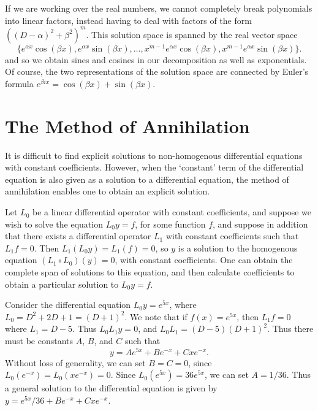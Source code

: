 \begin{remark}
    If we are working over the real numbers, we cannot completely break polynomials into linear factors, instead having to deal with factors of the form $((D - \alpha)^2 + \beta^2)^m$. This solution space is spanned by the real vector space
    \[ \{ e^{\alpha x} \cos(\beta x), e^{\alpha x} \sin(\beta x), \dots, x^{m-1} e^{\alpha x} \cos(\beta x), x^{m-1} e^{\alpha x} \sin(\beta x) \}. \]
    and so we obtain sines and cosines in our decomposition as well as exponentials. Of course, the two representations of the solution space are connected by Euler's formula $e^{\beta ix} = \cos(\beta x) + \sin(\beta x)$.
\end{remark}


\section{The Method of Annihilation}

It is difficult to find explicit solutions to non-homogenous differential equations with constant coefficients. However, when the `constant' term of the differential equation is also given as a solution to a differential equation, the method of annihilation enables one to obtain an explicit solution.

Let $L_0$ be a linear differential operator with constant coefficients, and suppose we wish to solve the equation $L_0y = f$, for some function $f$, and suppose in addition that there exists a differential operator $L_1$ with constant coefficients such that $L_1f = 0$. Then $L_1(L_0 y) = L_1(f) = 0$, so $y$ is a solution to the homogenous equation $(L_1 \circ L_0)(y) = 0$, with constant coefficients. One can obtain the complete span of solutions to this equation, and then calculate coefficients to obtain a particular solution to $L_0y = f$.

\begin{example}
    Consider the differential equation $L_0y = e^{5x}$, where $L_0 = D^2 + 2D + 1 = (D + 1)^2$. We note that if $f(x) = e^{5x}$, then $L_1 f = 0$ where $L_1 = D - 5$. Thus $L_0L_1y = 0$, and $L_0L_1 = (D - 5)(D+1)^2$. Thus there must be constants $A$, $B$, and $C$ such that
    \[ y = A e^{5x} + B e^{-x} + C x e^{-x}. \]
    Without loss of generality, we can set $B = C = 0$, since $L_0(e^{-x}) = L_0(xe^{-x}) = 0$. Since $L_0(e^{5x}) = 36 e^{5x}$, we can set $A = 1/36$. Thus a general solution to the differential equation is given by $y = e^{5x}/36 + Be^{-x} + Cxe^{-x}$.
\end{example}

\begin{thebibliography}{9}


\end{thebibliography}

